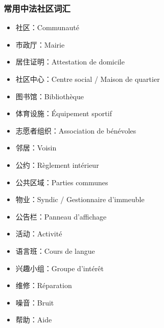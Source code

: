 \subsubsection{常用中法社区词汇}
\begin{itemize}
    \item 社区：Communauté
    \item 市政厅：Mairie
    \item 居住证明：Attestation de domicile
    \item 社区中心：Centre social / Maison de quartier
    \item 图书馆：Bibliothèque
    \item 体育设施：Équipement sportif
    \item 志愿者组织：Association de bénévoles
    \item 邻居：Voisin
    \item 公约：Règlement intérieur
    \item 公共区域：Parties communes
    \item 物业：Syndic / Gestionnaire d’immeuble
    \item 公告栏：Panneau d’affichage
    \item 活动：Activité
    \item 语言班：Cours de langue
    \item 兴趣小组：Groupe d’intérêt
    \item 维修：Réparation
    \item 噪音：Bruit
    \item 帮助：Aide
\end{itemize}
